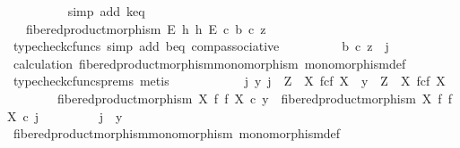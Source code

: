 \begin{isabellebody}
\ \ \ \ \ \ \ \ \isamarkupfalse%
\ {\isacharparenleft}{\kern0pt}simp\ add{\isacharcolon}{\kern0pt}\ k{\isacharunderscore}{\kern0pt}eq{\isacharparenright}{\kern0pt}\isanewline
\ \ \ \ \ \ \isamarkupfalse%
\ \isamarkupfalse%
\ {\isachardoublequoteopen}{\isachardot}{\kern0pt}{\isachardot}{\kern0pt}{\isachardot}{\kern0pt}\ {\isacharequal}{\kern0pt}\ fibered{\isacharunderscore}{\kern0pt}product{\isacharunderscore}{\kern0pt}morphism\ E\ h\ h\ E\ {\isasymcirc}\isactrlsub c\ b\ {\isasymcirc}\isactrlsub c\ z{\isachardoublequoteclose}\isanewline
\ \ \ \ \ \ \ \ \isamarkupfalse%
\ {\isacharparenleft}{\kern0pt}typecheck{\isacharunderscore}{\kern0pt}cfuncs{\isacharcomma}{\kern0pt}\ simp\ add{\isacharcolon}{\kern0pt}\ b{\isacharunderscore}{\kern0pt}eq\ comp{\isacharunderscore}{\kern0pt}associative{}{\isacharparenright}{\kern0pt}\isanewline
\ \ \ \ \ \ \isamarkupfalse%
\ \isamarkupfalse%
\ {\isachardoublequoteopen}b\ {\isasymcirc}\isactrlsub c\ z\ {\isacharequal}{\kern0pt}\ j{\isachardoublequoteclose}\isanewline
\ \ \ \ \ \ \ \ \isamarkupfalse%
\ calculation\ fibered{\isacharunderscore}{\kern0pt}product{\isacharunderscore}{\kern0pt}morphism{\isacharunderscore}{\kern0pt}monomorphism\ monomorphism{\isacharunderscore}{\kern0pt}def{}\ \isamarkupfalse%
\ {\isacharparenleft}{\kern0pt}typecheck{\isacharunderscore}{\kern0pt}cfuncs{\isacharunderscore}{\kern0pt}prems{\isacharcomma}{\kern0pt}\ metis{\isacharparenright}{\kern0pt}\isanewline
\ \ \ \ \isamarkupfalse%
\isanewline
\isanewline
\ \ \ \ \isamarkupfalse%
\ {\isachardoublequoteopen}{\isasymAnd}\ j\ y{\isachardot}{\kern0pt}\ j\ {\isacharcolon}{\kern0pt}\ Z\ {\isasymrightarrow}\ X\ \isactrlbsub f\isactrlesub {\isasymtimes}\isactrlsub c\isactrlbsub f\isactrlesub \ X\ {\isasymLongrightarrow}\ y\ {\isacharcolon}{\kern0pt}\ Z\ {\isasymrightarrow}\ X\ \isactrlbsub f\isactrlesub {\isasymtimes}\isactrlsub c\isactrlbsub f\isactrlesub \ X\ {\isasymLongrightarrow}\isanewline
\ \ \ \ \ \ \ \ fibered{\isacharunderscore}{\kern0pt}product{\isacharunderscore}{\kern0pt}morphism\ X\ f\ f\ X\ {\isasymcirc}\isactrlsub c\ y\ {\isacharequal}{\kern0pt}\ fibered{\isacharunderscore}{\kern0pt}product{\isacharunderscore}{\kern0pt}morphism\ X\ f\ f\ X\ {\isasymcirc}\isactrlsub c\ j\ {\isasymLongrightarrow}\isanewline
\ \ \ \ \ \ \ \ j\ {\isacharequal}{\kern0pt}\ y{\isachardoublequoteclose}\isanewline
\ \ \ \ \ \ \isamarkupfalse%
\ fibered{\isacharunderscore}{\kern0pt}product{\isacharunderscore}{\kern0pt}morphism{\isacharunderscore}{\kern0pt}monomorphism\ monomorphism{\isacharunderscore}{\kern0pt}def{}\ \isamarkupfalse%

\end{isabellebody}
